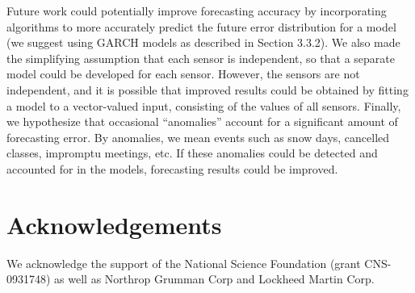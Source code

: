 \documentclass{acm_proc_article-sp}
\begin{document}
Future work could potentially improve forecasting accuracy by incorporating algorithms to more accurately predict the future error distribution for a model (we suggest using GARCH models as described in Section 3.3.2).  We also made the simplifying assumption that each sensor is independent, so that a separate model could be developed for each sensor.  However, the sensors are not independent, and it is possible that improved results could be obtained by fitting a model to a vector-valued input, consisting of the values of all sensors.  Finally, we hypothesize that occasional “anomalies” account for a significant amount of forecasting error.  By anomalies, we mean events such as snow days, cancelled classes, impromptu meetings, etc.  If these anomalies could be detected and accounted for in the models, forecasting results could be 
improved.

\section{Acknowledgements}
We acknowledge the support of the National Science Foundation (grant CNS-0931748) as well as Northrop Grumman Corp and Lockheed Martin Corp.


 
\end{document}
